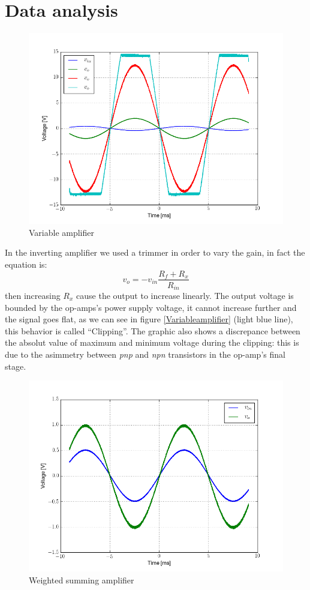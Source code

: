 \section{Data analysis}
\begin{figure}[H]
\centering
\includegraphics[width=.7\textwidth]{2/Variable_amplifier.png}
\caption{Variable amplifier}\label{Variableamplifier}
\end{figure}
In the inverting amplifier we used a trimmer in order to vary the gain, in fact the equation is:
\[v_{o} = -v_{in}\frac{R_f+R_x}{R_{in}}\]
then increasing $R_x$ cause the output to increase linearly. The output voltage is bounded by the op-amps's power supply voltage, it cannot increase further and the signal goes flat, as we can see in figure \eqref{Variableamplifier} (light blue line), this behavior is called ``Clipping''. The graphic also shows a discrepance between the absolut value of maximum and minimum voltage during the clipping: this is due to the asimmetry between \emph{pnp} and \emph{npn} transistors in the op-amp's final stage.
\begin{figure}[H]
\centering
\includegraphics[width=.7\textwidth]{2/Weighted_amplifier.png}
\caption{Weighted summing amplifier}\label{Weighted_amplifier}
\end{figure}
